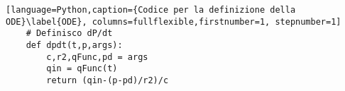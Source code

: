\begin{lstlisting}[language=Python,caption={Codice per la definizione della ODE}\label{ODE}, columns=fullflexible,firstnumber=1, stepnumber=1]
    # Definisco dP/dt
    def dpdt(t,p,args):
        c,r2,qFunc,pd = args
        qin = qFunc(t)
        return (qin-(p-pd)/r2)/c
\end{lstlisting}